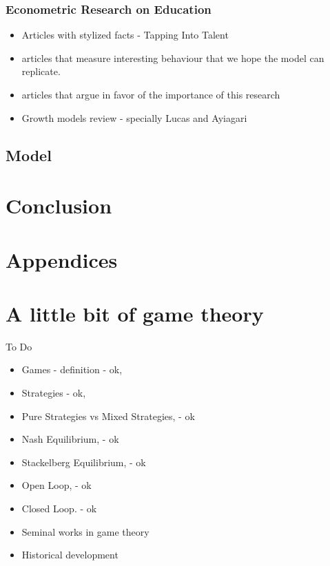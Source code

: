 \documentclass{article}
\begin{document}
\subsubsection{Econometric Research on Education}
\begin{itemize}
    \item Articles with stylized facts - Tapping Into Talent
    \item articles that measure interesting behaviour that we hope the model can replicate.
    \item articles that argue in favor of the importance of this research
    \item Growth models review - specially Lucas and Ayiagari
\end{itemize}


\subsection{Model}





\section{Conclusion}

\appendix
{}
\section*{Appendices}
\section{A little bit of game theory}\label{appendix-game-theory}
To Do
\begin{itemize}
    \item Games - definition - ok, 
    \item Strategies - ok, 
    \item Pure Strategies vs Mixed Strategies, - ok
    \item Nash Equilibrium, - ok 
    \item Stackelberg Equilibrium,  - ok
    \item Open Loop, - ok
    \item Closed Loop. - ok
    \item Seminal works in game theory
    \item Historical development
\end{itemize}
\end{document}
